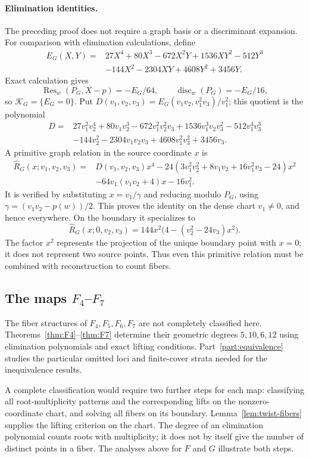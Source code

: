 \documentclass[11pt]{article}
\numberwithin{equation}{section}
\theoremstyle{plain}
\theoremstyle{definition}
\theoremstyle{remark}
\begin{document}
\paragraph{Elimination identities.}
The preceding proof does not require a graph basis or a discriminant
expansion. For comparison with elimination calculations, define
\begin{align*}
 E_G(X,Y)={}&27X^4+80X^3-672X^2Y+1536XY^2-512Y^3\\
 &-144X^2-2304XY+4608Y^2+3456Y.
\end{align*}
Exact calculation gives
\[
 \operatorname{Res}_w(P_G,X-p)=-E_G/64,\qquad
 \operatorname{disc}_w(P_G)=-E_G/16,
\]
so $\mathcal K_G=\{E_G=0\}$. Put $D(v_1,v_2,v_3)=E_G(v_1v_2,v_1^2v_3)/v_1^2$;
this quotient is the polynomial
\begin{align*}
 D={}&27v_1^2v_2^4+80v_1v_2^3-672v_1^2v_2^2v_3+1536v_1^3v_2v_3^2-512v_1^4v_3^3\\
 &-144v_2^2-2304v_1v_2v_3+4608v_1^2v_3^2+3456v_3.
\end{align*}
A primitive graph relation in the source coordinate $x$ is
\begin{align*}
 \widehat R_G(x;v_1,v_2,v_3)={}&D(v_1,v_2,v_3)x^4
 -24(3v_1^2v_2^2+8v_1v_2+16v_1^2v_3-24)x^2\\
 &-64v_1(v_1v_2+4)x-16v_1^2.
\end{align*}
It is verified by substituting $x=v_1/\gamma$ and reducing modulo $P_G$,
using $\gamma=(v_1v_2-p(w))/2$. This proves the identity on the dense
chart $v_1\ne0$, and hence everywhere. On the boundary it specializes to
\[
 \widehat R_G(x;0,v_2,v_3)=144x^2\bigl(4-(v_2^2-24v_3)x^2\bigr).
\]
The factor $x^2$ represents the projection of the unique boundary point
with $x=0$; it does not represent two source points. Thus even this
primitive relation must be combined with reconstruction to count fibers.

\subsection{The maps \texorpdfstring{$F_4$--$F_7$}{F4--F7}}\label{app:F4}
The fiber structures of $F_4,F_5,F_6,F_7$ are not completely classified
here. Theorems~\ref{thm:F4}--\ref{thm:F7} determine their geometric
degrees $5,10,6,12$ using elimination polynomials and exact lifting
conditions. Part~\ref{part:equivalence} studies the particular omitted
loci and finite-cover strata needed for the inequivalence results.

A complete classification would require two further steps for each map:
classifying all root-multiplicity patterns and the corresponding lifts on
the nonzero-coordinate chart, and solving all fibers on its boundary.
Lemma~\ref{lem:twist-fibers} supplies the lifting criterion on the chart.
The degree of an elimination polynomial counts roots with multiplicity;
it does not by itself give the number of distinct points in a fiber.
The analyses above for $F$ and $G$ illustrate both steps.
\end{document}
